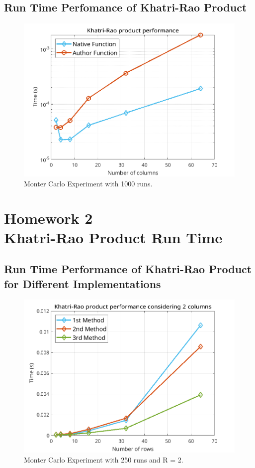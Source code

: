 \documentclass[a4paper,10pt]{article}
\begin{document}
    \subsection*{Run Time Perfomance of Khatri-Rao Product}

    \begin{figure}[ht!]
        \centering 
        \includegraphics[width=0.75\linewidth]{figs/hw1a3.png} \par 
        \caption{Monter Carlo Experiment with 1000 runs.}
        \label{fig:hw1a3} 
    \end{figure}

\newpage
\section*{Homework 2 \\ Khatri-Rao Product Run Time}

    \subsection*{Run Time Performance of Khatri-Rao Product for Different Implementations}

    \begin{figure}[ht!]
        \centering 
        \includegraphics[width=0.75\linewidth]{figs/hw2a1.png} \par 
        \caption{Monter Carlo Experiment with 250 runs and R = 2.}
        \label{fig:hw2a1} 
    \end{figure}
\end{document}
